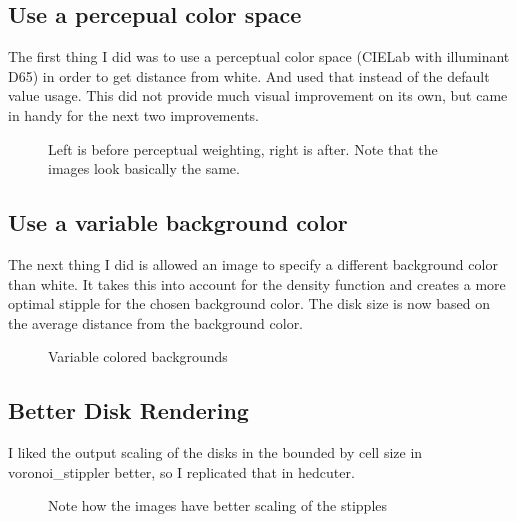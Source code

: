 \documentclass[11pt]{article}
\begin{document}
\subsection{Use a percepual color space}
The first thing I did was to use a perceptual color space (CIELab with
illuminant D65) in order to get distance from white. And used that
instead of the default value usage. This did not provide much visual
improvement on its own, but came in handy for the next two improvements.

\begin{figure}[H]
  \centering
  \begin{minipage}{.5\textwidth}
    \centering
    
  \end{minipage}%
  \begin{minipage}{.5\textwidth}
    \centering
    
  \end{minipage}
  \caption{Left is before perceptual weighting, right is after. Note
    that the images look basically the same.}
\end{figure}

\subsection{Use a variable background color}
The next thing I did is allowed an image to specify a different
background color than white. It takes this into account for the
density function and creates a more optimal stipple for the chosen
background color. The disk size is now based on the average distance
from the background color.

\begin{figure}[H]
  \centering
  \begin{minipage}{.5\textwidth}
    \centering
    
  \end{minipage}%
  \begin{minipage}{.5\textwidth}
    \centering
    
  \end{minipage}
  \caption{Variable colored backgrounds}
\end{figure}

\subsection{Better Disk Rendering}
I liked the output scaling of the disks in the bounded by cell size in
voronoi\_stippler better, so I replicated that in hedcuter.

\begin{figure}[H]
  \centering
  \begin{minipage}{.5\textwidth}
    \centering
    
  \end{minipage}%
  \begin{minipage}{.5\textwidth}
    \centering
    
  \end{minipage}
  \caption{Note how the images have better scaling of the stipples}
\end{figure}





\end{document}
